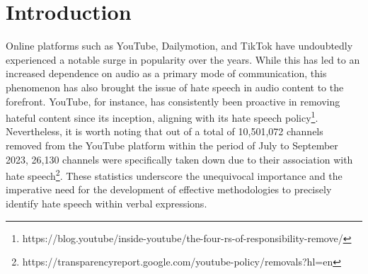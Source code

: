 \documentclass[11pt]{article}
\begin{document}
\begin{abstract}
    Research on hate speech has predominantly revolved around detection and interpretation from textual inputs, leaving verbal content largely unexplored. While there has been limited exploration into hate speech detection within verbal acoustic speech inputs, the aspect of interpretability has been overlooked. Therefore, we introduce a new task of explainable audio hate speech detection. Specifically, we aim to identify the precise time intervals, referred to as audio frame-level rationales, which serve as evidence for hate speech classification. Towards this end, we propose two different approaches: cascading and End-to-End (E2E). The cascading approach initially converts audio to transcripts, identifies hate speech within these transcripts, and subsequently locates the corresponding audio time frames. Conversely, the E2E approach processes audio utterances directly, which allows it to pinpoint hate speech within specific time frames. Additionally, due to the lack of explainable audio hate speech datasets that include audio frame-level rationales, we curated a synthetic audio dataset to train our models. We further validated these models on actual human speech utterances and found that the E2E approach outperforms the cascading method in terms of the audio frame Intersection over Union (IoU) metric. Furthermore, we observed that including frame-level rationales significantly enhances hate speech detection accuracy for the E2E approach.
    
  \textbf{Disclaimer} The reader may encounter content of an offensive or hateful nature. However, given the nature of the work, this cannot be avoided.
\end{abstract}

\section{Introduction}

Online platforms such as YouTube, Dailymotion, and TikTok have undoubtedly experienced a notable surge in popularity over the years. While this has led to an increased dependence on audio as a primary mode of communication, this phenomenon has also brought the issue of hate speech in audio content to the forefront. YouTube, for instance, has consistently been proactive in removing hateful content since its inception, aligning with its hate speech policy\footnote{https://blog.youtube/inside-youtube/the-four-rs-of-responsibility-remove/}. Nevertheless, it is worth noting that out of a total of 10,501,072 channels removed from the YouTube platform within the period of July to September 2023, 26,130 channels were specifically taken down due to their association with hate speech\footnote{https://transparencyreport.google.com/youtube-policy/removals?hl=en}. These statistics underscore the unequivocal importance and the imperative need for the development of effective methodologies to precisely identify hate speech within verbal expressions.
\end{document}
